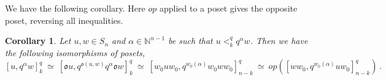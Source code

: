 \documentclass[12pt,oneside,reqno]{amsart}
\newtheorem{corollary}[theorem]{Corollary}
\theoremstyle{definition}
\numberwithin{equation}{section}
\newcommand{\NN}{{\mathbb N}}
\newcommand{\ncycle}{\mathfrak o}
\begin{document}
We have the following corollary.
Here $\textit{op}$ applied to a poset gives the opposite poset, reversing all inequalities.

\begin{corollary}\label{C:equivalences}
  Let $u,w\in S_n$ and $\alpha\in\NN^{n-1}$ be such that $u <_k^q q^\alpha w$.
  Then we have the following isomorphisms of posets,
  \[
    [u,q^\alpha w]_k^q
    \ \simeq\ 
    [\ncycle u, q^{\ncycle(u,w)} q^\alpha \ncycle w]_k^q
     \ \simeq\ 
    [w_0 uw_0,q^{w_0(\alpha)} w_0 w w_0]_{n-k}^q
    \ \simeq\ 
    \textit{op}\left([ww_0,q^{w_0(\alpha)} u w_0]_{n-k}^q\right)\,.
  \]
\end{corollary}
\end{document}

